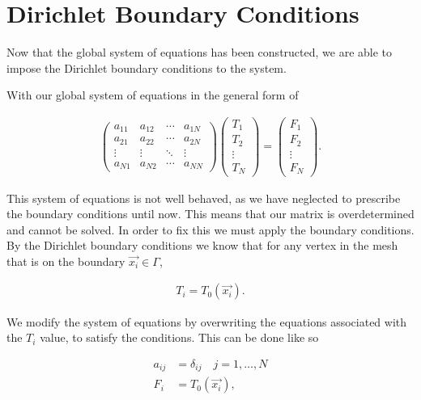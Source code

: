\documentclass[../fem.tex]{subfiles}
\begin{document}
\section{Dirichlet Boundary Conditions}%
\label{sec:dirichlet_boundary_conditions}

Now that the global system of equations has been constructed, we are able to
impose the Dirichlet boundary conditions to the system.

With our global system of equations in the general form of

\begin{align}\label{eq:global_sys}
  \begin{pmatrix}
    a_{11} & a_{12} & \cdots & a_{1N}\\
    a_{21} & a_{22} & \cdots & a_{2N}\\
    \vdots & \vdots & \ddots & \vdots \\
    a_{N1} & a_{N2} & \cdots & a_{NN}
  \end{pmatrix}
  \begin{pmatrix}
    T_1 \\ T_2 \\ \vdots \\ T_N
  \end{pmatrix}
  =
  \begin{pmatrix}
    F_1 \\ F_2 \\ \vdots \\ F_N
  \end{pmatrix}.
\end{align}

This system of equations is not well behaved, as we have neglected to prescribe
the boundary conditions until now. This means that our matrix is overdetermined
and cannot be solved. In order to fix this we must apply the boundary
conditions. By the Dirichlet boundary conditions we know that for any vertex in
the mesh that is on the boundary $\vec{x_i}\in\Gamma$,

\begin{align*}
  T_i=T_0(\vec{x_i}).
\end{align*}

We modify the system of equations by overwriting the equations associated with
the $T_i$ value, to satisfy the conditions. This can be done like so

\begin{align*}
  a_{ij}&=\delta_{ij}\quad j=1,\ldots,N\\
  F_i&=T_0(\vec{x_i}),
\end{align*}
\end{document}

